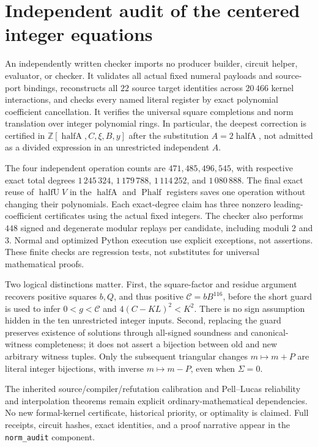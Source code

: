 \section{Independent audit of the centered integer equations}
An independently written checker imports no producer builder, circuit helper,
evaluator, or checker. It validates all actual fixed numeral payloads and
source-port bindings, reconstructs all $22$ source target identities across
$20\,466$ kernel interactions, and checks every named literal register by
exact polynomial coefficient cancellation. It verifies the universal square
completions and norm translation over integer polynomial rings. In particular,
the deepest correction is certified in
$\mathbb Z[\operatorname{halfA},C,\xi,B,y]$ after the substitution
$A=2\operatorname{halfA}$, not admitted as a divided expression in an
unrestricted independent $A$.

The four independent operation counts are $471,485,496,545$, with respective
exact total degrees $1\,245\,324$, $1\,179\,788$, $1\,114\,252$, and
$1\,080\,888$. The final exact reuse of $\operatorname{halfU}V$ in the $\operatorname{halfA}$ and $\operatorname{Phalf}$ registers saves one operation without changing their polynomials. Each exact-degree claim has three nonzero leading-coefficient
certificates using the actual fixed integers. The checker also performs
$448$ signed and degenerate modular replays per candidate, including moduli
$2$ and $3$. Normal and optimized Python execution use explicit exceptions,
not assertions. These finite checks are regression tests, not substitutes for
universal mathematical proofs.

Two logical distinctions matter. First, the square-factor and residue
argument recovers positive squares $b,Q$, and thus positive
$\mathcal C=bB^{116}$, before the short guard is used to infer
$0<g<\mathcal C$ and $4(C-KL)^2<K^2$. There is no sign assumption hidden in the
ten unrestricted integer inputs. Second, replacing the guard preserves
existence of solutions through all-signed soundness and canonical-witness
completeness; it does not assert a bijection between old and new arbitrary
witness tuples. Only the subsequent triangular changes
$m\mapsto m+P$ are literal integer bijections, with inverse $m\mapsto m-P$,
even when $\Sigma=0$.

The inherited source/compiler/refutation calibration and Pell--Lucas
reliability and interpolation theorems remain explicit ordinary-mathematical
dependencies. No new formal-kernel certificate, historical priority, or
optimality is claimed. Full receipts, circuit hashes, exact identities, and
a proof narrative appear in the \texttt{norm\_audit} component.
